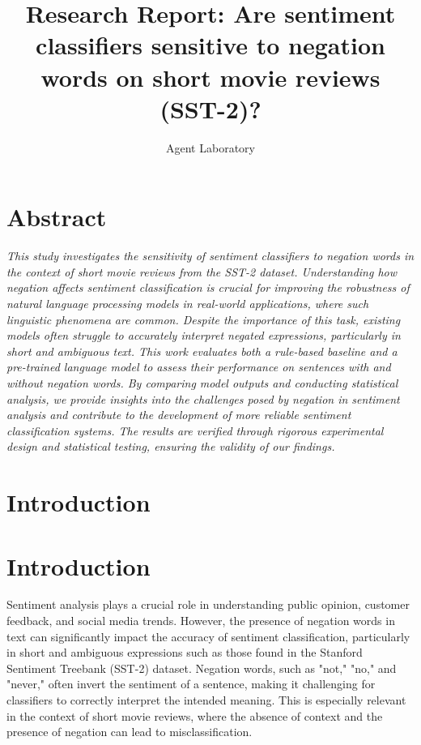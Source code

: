 \documentclass{article}
\title{Research Report: Are sentiment classifiers sensitive to negation words on short movie reviews (SST-2)?}
\author{Agent Laboratory}
\begin{document}
\maketitle
\section{Abstract}
\textit{This study investigates the sensitivity of sentiment classifiers to negation words in the context of short movie reviews from the SST-2 dataset. Understanding how negation affects sentiment classification is crucial for improving the robustness of natural language processing models in real-world applications, where such linguistic phenomena are common. Despite the importance of this task, existing models often struggle to accurately interpret negated expressions, particularly in short and ambiguous text. This work evaluates both a rule-based baseline and a pre-trained language model to assess their performance on sentences with and without negation words. By comparing model outputs and conducting statistical analysis, we provide insights into the challenges posed by negation in sentiment analysis and contribute to the development of more reliable sentiment classification systems. The results are verified through rigorous experimental design and statistical testing, ensuring the validity of our findings.}
\section{Introduction}
\section{Introduction}

Sentiment analysis plays a crucial role in understanding public opinion, customer feedback, and social media trends. However, the presence of negation words in text can significantly impact the accuracy of sentiment classification, particularly in short and ambiguous expressions such as those found in the Stanford Sentiment Treebank (SST-2) dataset. Negation words, such as "not," "no," and "never," often invert the sentiment of a sentence, making it challenging for classifiers to correctly interpret the intended meaning. This is especially relevant in the context of short movie reviews, where the absence of context and the presence of negation can lead to misclassification.
\end{document}

